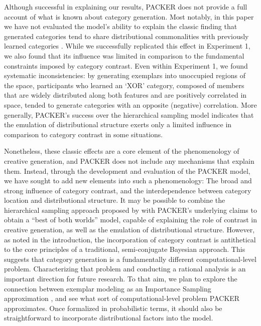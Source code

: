 \documentclass[12pt]{article}
\begin{document}
\begin{flushleft}
Although successful in explaining our results, PACKER does not provide a full account of what is known about category generation. Most notably, in this paper we have not evaluated the model's ability to explain the classic finding that generated categories tend to share distributional commonalities with previously learned categories \citep[see][]{jern2013probabilistic,ward1994structured}. While we successfully replicated this effect in Experiment 1, we also found that its influence was limited in comparison to the fundamental constraints imposed by  category contrast. Even within Experiment 1, we found systematic inconsistencies: by generating exemplars into unoccupied regions of the space, participants who learned an `XOR' category, composed of members that are widely distributed along both features and are positively correlated in space, tended to generate categories with an opposite (negative) correlation. More generally, PACKER's success over the hierarchical sampling model indicates that the emulation of distributional structure exerts only a limited influence in comparison to category contrast in some situations.

Nonetheless, these classic effects are a core element of the phenomenology of creative generation, and PACKER does not include any mechanisms that explain them. Instead, through the development and evaluation of the PACKER model, we have sought to add new elements into such a phenomenology: The broad and strong influence of category contrast, and the interdependence between category location and distributional structure. It may be possible to combine the hierarchical sampling approach proposed by \cite{jern2013probabilistic} with PACKER's underlying claims to obtain a ``best of both worlds'' model, capable of explaining the role of contrast in creative generation, as well as the emulation of distributional structure. However, as noted in the introduction, the incorporation of category contrast is antithetical to the core principles of a traditional, semi-conjugate Bayesian approach. This suggests that category generation is a fundamentally different computational-level problem. Characterizing that problem and conducting a rational analysis is an important direction for future research. To that aim, we plan to explore the connection between exemplar modeling as an Importance Sampling approximation \citep{shi10exemplar}, and see what sort of computational-level problem PACKER approximates. Once formalized in probabilistic terms, it should also be straightforward to incorporate distributional factors into the model.


\end{flushleft}
\end{document}
